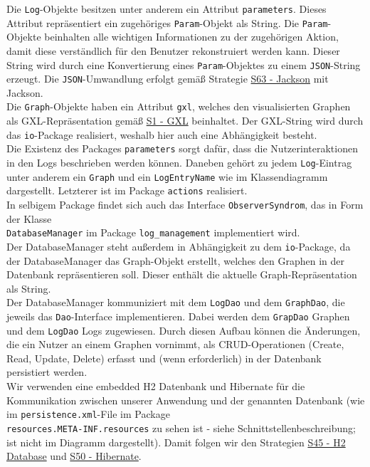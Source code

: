 \documentclass[enabledeprecatedfontcommands,fontsize=11pt,paper=a4,twoside]{scrartcl}
\newcounter{one}
\begin{document}
	Die \texttt{Log}-Objekte besitzen unter anderem ein Attribut \texttt{parameters}. Dieses Attribut repräsentiert ein zugehöriges \texttt{Param}-Objekt als String. Die \texttt{Param}-Objekte beinhalten alle wichtigen Informationen zu der zugehörigen Aktion, damit diese verständlich für den Benutzer rekonstruiert werden kann. Dieser String wird durch eine Konvertierung eines \texttt{Param}-Objektes zu einem \texttt{JSON}-String erzeugt. Die \texttt{JSON}-Umwandlung erfolgt gemäß Strategie \hyperlink{www}{S63 - Jackson} mit Jackson. \\
	
	Die \texttt{Graph}-Objekte haben ein Attribut \texttt{gxl}, welches den visualisierten Graphen als GXL-Repräsentation gemäß \hyperlink{yy}{S1 - GXL} beinhaltet. Der GXL-String wird durch das \texttt{io}-Package realisiert, weshalb hier auch eine Abhängigkeit besteht.\\
	
	Die Existenz des Packages \texttt{parameters} sorgt dafür, dass die Nutzerinteraktionen in den Logs beschrieben werden können. Daneben gehört zu jedem \texttt{Log}-Eintrag unter anderem ein \texttt{Graph} und ein \texttt{LogEntryName} wie im Klassendiagramm dargestellt. Letzterer ist im Package \texttt{actions} realisiert. \\
	
	In selbigem Package findet sich auch das Interface \texttt{ObserverSyndrom}, das in Form der Klasse\\ \texttt{DatabaseManager} im Package \texttt{log\_management} implementiert wird. \\
	Der DatabaseManager steht außerdem in Abhängigkeit zu dem \texttt{io}-Package, da der DatabaseManager das Graph-Objekt erstellt, welches den Graphen in der Datenbank repräsentieren soll. Dieser enthält die aktuelle Graph-Repräsentation als String. \\
	Der DatabaseManager kommuniziert mit dem \texttt{LogDao} und dem \texttt{GraphDao}, die jeweils das \texttt{Dao}-Interface implementieren. Dabei werden dem \texttt{GrapDao} Graphen und dem \texttt{LogDao} Logs zugewiesen. Durch diesen Aufbau können die Änderungen, die ein Nutzer an einem Graphen vornimmt, als CRUD-Operationen (Create, Read, Update, Delete) erfasst und (wenn erforderlich) in der Datenbank persistiert werden. \\ 
	
	Wir verwenden eine embedded H2 Datenbank und Hibernate für die Kommunikation zwischen unserer Anwendung und der genannten Datenbank (wie im \texttt{persistence.xml}-File im Package\\ \texttt{resources.META-INF.resources} zu sehen ist - siehe Schnittstellenbeschreibung; ist nicht im Diagramm dargestellt). Damit folgen wir den Strategien \hyperlink{ppp}{S45 - H2 Database} und \hyperlink{rrr}{S50 - Hibernate}. \\
	
\end{document}
